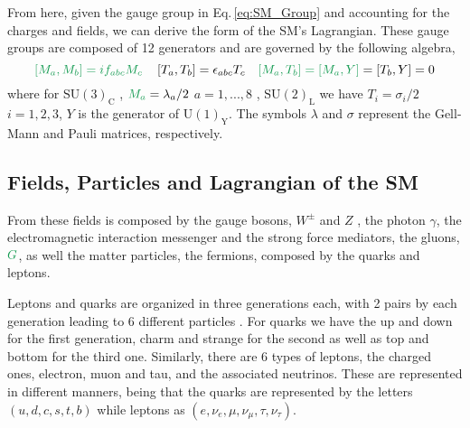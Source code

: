 %
From here, given the gauge group in Eq.\,\eqref{eq:SM_Group} and accounting for the charges and fields, we can derive the form of the SM's Lagrangian. These gauge groups are composed of 12 generators and are governed by the following algebra, 
% 
\begin{equation}
\Joaoadd{\left[ M_a , M_b \right] = i f_{abc} M_c} \quad \left[ T_a , T_b \right] =  \epsilon_{abc} T_c \quad \Joaoadd{\left[ M_a , T_b \right] = \left[ M_a , Y \right]} = \left[ T_b,Y \right] = 0 
\end{equation}
%
where for  $\mathrm{SU(3)_C}$ ,  $\Joaoadd{M_a}= \lambda_a/2$  $a = 1, . . . , 8$ ,  $\mathrm{SU(2)_L}$ we have $T_i= \sigma_i/2 $  $i = 1, 2, 3$,   $Y$ is the generator of $\mathrm{U(1)_Y}$. The symbols $\lambda$ and $\sigma$ represent the Gell-Mann and Pauli matrices, respectively. 

\subsection{Fields, Particles and Lagrangian of the SM}

From these fields\Joaoadd{,}  is composed by the gauge bosons,  $W^\pm$ and $Z$ ,   the photon $\gamma$, the electromagnetic interaction messenger and the strong force mediators, the gluons, $\Joaoadd{G}$, as well  the matter particles, the fermions, composed by the quarks and leptons. 

Leptons and quarks are organized in three generations each, with 2 pairs by each generation leading to 6 different particles . 
%
For quarks we have the up and down for the first generation, charm and strange for the second as well as  top and bottom for the third one. 
%
Similarly, there are 6 types of leptons, the charged ones, electron, muon and tau, and the associated neutrinos. These are represented in different manners, being that the quarks are represented by the letters $(u,d,c,s,t,b)$ while leptons as $(e,\nu_{e},\mu,\nu_{\mu},\tau,\nu_{\tau})$. 

